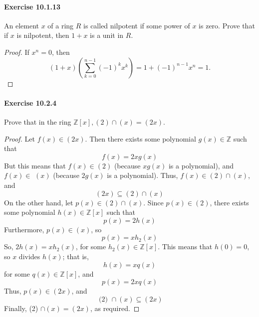 \documentclass{article}
\begin{document}
\paragraph{Exercise 10.1.13} An element $x$ of a ring $R$ is called nilpotent if some power of $x$ is zero. Prove that if $x$ is nilpotent, then $1+x$ is a unit in $R$.
\begin{proof}
    If $x^n=0$, then
$$
(1+x)\left(\sum_{k=0}^{n-1}(-1)^k x^k\right)=1+(-1)^{n-1} x^n=1 .
$$
\end{proof}



\paragraph{Exercise 10.2.4} Prove that in the ring $\mathbb{Z}[x],(2) \cap(x)=(2 x)$.
\begin{proof}
    Let $f(x) \in(2 x)$. Then there exists some polynomial $g(x) \in \mathbb{Z}$ such that
$$
f(x)=2 x g(x)
$$
But this means that $f(x) \in(2)$ (because $x g(x)$ is a polynomial), and $f(x) \in$ $(x)$ (because $2 g(x)$ is a polynomial). Thus, $f(x) \in(2) \cap(x)$, and
$$
(2 x) \subseteq(2) \cap(x)
$$
On the other hand, let $p(x) \in(2) \cap(x)$. Since $p(x) \in(2)$, there exists some polynomial $h(x) \in \mathbb{Z}[x]$ such that
$$
p(x)=2 h(x)
$$
Furthermore, $p(x) \in(x)$, so
$$
p(x)=x h_2(x)
$$
So, $2 h(x)=x h_2(x)$, for some $h_2(x) \in \mathbb{Z}[x]$. This means that $h(0)=0$, so $x$ divides $h(x)$; that is,
$$
h(x)=x q(x)
$$
for some $q(x) \in \mathbb{Z}[x]$, and
$$
p(x)=2 x q(x)
$$
Thus, $p(x) \in(2 x)$, and
$$
\text { (2) } \cap(x) \subseteq(2 x)
$$
Finally,
(2) $\cap(x)=(2 x)$,
as required.
\end{proof}
\end{document}
